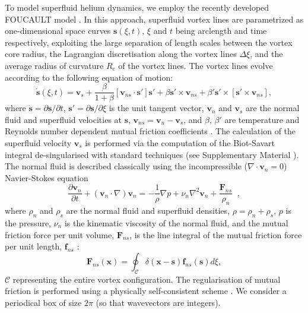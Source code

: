\documentclass[%
 reprint,
 amsmath,amssymb,
 aps,
 prl,
]{revtex4-2}
\def \s{\mathbf{s}}
\def \v{\mathbf{v}}
\def \x{\mathbf{x}}
\begin{document}
{To model superfluid helium dynamics, we employ the recently developed FOUCAULT model
\cite{galantucciNewSelfconsistentApproach2020b}.  In this approach, superfluid vortex lines are
parametrized as one-dimensional space curves  $\s(\xi,t)$, $\xi$ and $t$ being arclength and time respectively, exploiting the large separation of length scales between the vortex core radius, the Lagrangian discretisation along the vortex lines $\Delta\xi$, and the average radius of curvature $R_c$ of the vortex lines. The vortex lines evolve according to the following equation of motion:
\begin{equation}
    \dot{\s}(\xi,t) = \v_s + \frac{\beta}{1+\beta}\left[\v_{ns}\cdot\s'\right]\s' + \beta\s'\times\v_{ns} + \beta'\s'\times\left[\s'\times\v_{ns}\right],
\end{equation}
where $\dot{\s} = \partial\s/\partial t$, $\s' = \partial\s/\partial\xi$ is the unit tangent vector, $\v_n$ and $\v_s$ are the normal fluid and superfluid velocities at $\s$, $\v_{ns} = \v_n-\v_s$, and $\beta,\, \beta'$ are temperature and Reynolds number dependent mutual friction coefficients \cite{galantucciNewSelfconsistentApproach2020b}. The calculation of the superfluid velocity $\v_s$ is performed via the computation of the Biot-Savart integral de-singularised with standard techniques (see Supplementary Material \cite{suppMat}). The normal fluid is described classically using the incompressible ($\nabla\cdot\v_n=0$) 
Navier-Stokes equation
\begin{equation}
    \frac{\partial\v_n}{\partial t} + (\v_n\cdot\nabla)\v_n = -\frac{1}{\rho}\nabla p  + \nu_n\nabla^2\v_n + \frac{\mathbf{F}_{ns}}{\rho_n} \; \; , 
\end{equation}
%
where $\rho_n$ and $\rho_s$ are the normal fluid and superfluid densities,
$\rho=\rho_n + \rho_s$,  $p$ is the pressure,  $\nu_n$ is the kinematic 
viscosity of the normal fluid, and the mutual friction force per unit
volume, $\mathbf{F}_{ns}$, is the line integral of the mutual friction 
force per unit length, $\mathbf{f}_{ns}$ \cite{suppMat}:
%
\begin{equation}
\mathbf{F}_{ns}(\x) = 
\oint_{\mathcal{C}}\delta(\x-\s)\mathbf{f}_{ns}(\s)d\xi,     
\end{equation}
$\mathcal{C}$ representing the entire vortex configuration. 
The regularisation of mutual friction is performed using a physically self-consistent scheme \cite{galantucciNewSelfconsistentApproach2020b}. %
We consider a periodical box of size $2\pi$ (so that  wavevectors are integers).

}
\end{document}
